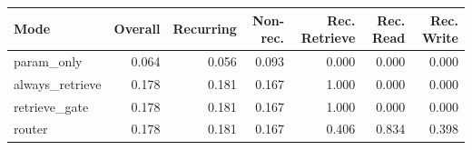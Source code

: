 \begin{tabular}{lrrrrrr}
\toprule
Mode & Overall & Recurring & Non-rec. & Rec. Retrieve & Rec. Read & Rec. Write \\
\midrule
param\_only & 0.064 & 0.056 & 0.093 & 0.000 & 0.000 & 0.000 \\
always\_retrieve & 0.178 & 0.181 & 0.167 & 1.000 & 0.000 & 0.000 \\
retrieve\_gate & 0.178 & 0.181 & 0.167 & 1.000 & 0.000 & 0.000 \\
router & 0.178 & 0.181 & 0.167 & 0.406 & 0.834 & 0.398 \\
\bottomrule
\end{tabular}


